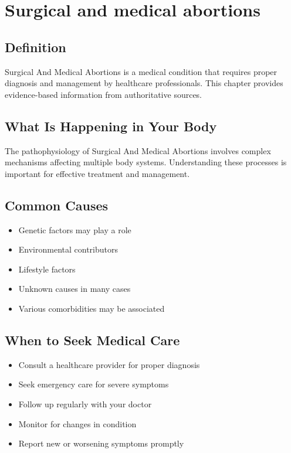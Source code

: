 
\chapter{Surgical and medical abortions}

\section*{Definition}
Surgical And Medical Abortions is a medical condition that requires proper diagnosis and management by healthcare professionals. This chapter provides evidence-based information from authoritative sources.

\section*{What Is Happening in Your Body}
The pathophysiology of Surgical And Medical Abortions involves complex mechanisms affecting multiple body systems. Understanding these processes is important for effective treatment and management.

\section*{Common Causes}
\begin{itemize}
  \item Genetic factors may play a role
  \item Environmental contributors
  \item Lifestyle factors
  \item Unknown causes in many cases
  \item Various comorbidities may be associated
\end{itemize}

\section*{When to Seek Medical Care}
\begin{itemize}
  \item Consult a healthcare provider for proper diagnosis
  \item Seek emergency care for severe symptoms
  \item Follow up regularly with your doctor
  \item Monitor for changes in condition
  \item Report new or worsening symptoms promptly
\end{itemize}

